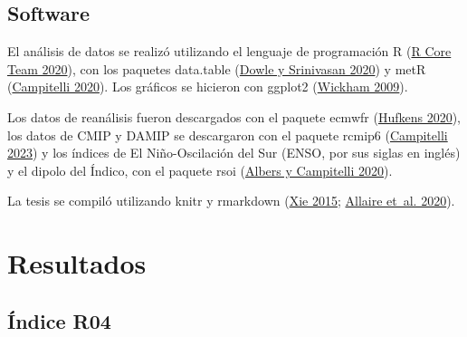 \documentclass[12pt,oneside,a4paper]{reedthesis}
\begin{document}
\hypertarget{software}{%
\subsection{Software}\label{software}}

El análisis de datos se realizó utilizando el lenguaje de programación R (\protect\hyperlink{ref-rcoreteam2020}{R Core Team 2020}), con los paquetes data.table (\protect\hyperlink{ref-dowle2020}{Dowle y Srinivasan 2020}) y metR (\protect\hyperlink{ref-campitelli2020}{Campitelli 2020}).
Los gráficos se hicieron con ggplot2 (\protect\hyperlink{ref-wickham2009}{Wickham 2009}).

Los datos de reanálisis fueron descargados con el paquete ecmwfr (\protect\hyperlink{ref-hufkens2020}{Hufkens 2020}), los datos de CMIP y DAMIP se descargaron con el paquete rcmip6 (\protect\hyperlink{ref-rcmip6}{Campitelli 2023}) y los índices de El Niño-Oscilación del Sur (ENSO, por sus siglas en inglés) y el dipolo del Índico, con el paquete rsoi (\protect\hyperlink{ref-albers2020}{Albers y Campitelli 2020}).

La tesis se compiló utilizando knitr y rmarkdown (\protect\hyperlink{ref-xie2015}{Xie 2015}; \protect\hyperlink{ref-allaire2020}{Allaire et~al. 2020}).

\hypertarget{resultados}{%
\section{Resultados}\label{resultados}}

\hypertarget{uxedndice-r04-1}{%
\subsection{Índice R04}\label{uxedndice-r04-1}}
\end{document}
